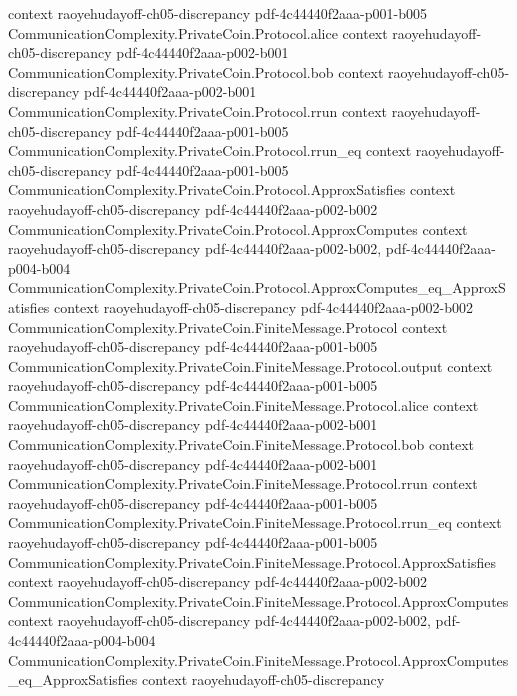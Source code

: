 \begin{lemma}
  {context}
  {raoyehudayoff-ch05-discrepancy}
  {pdf-4c44440f2aaa-p001-b005}
\proofstep
  {CommunicationComplexity.PrivateCoin.Protocol.alice}
  {context}
  {raoyehudayoff-ch05-discrepancy}
  {pdf-4c44440f2aaa-p002-b001}
\proofstep
  {CommunicationComplexity.PrivateCoin.Protocol.bob}
  {context}
  {raoyehudayoff-ch05-discrepancy}
  {pdf-4c44440f2aaa-p002-b001}
\proofstep
  {CommunicationComplexity.PrivateCoin.Protocol.rrun}
  {context}
  {raoyehudayoff-ch05-discrepancy}
  {pdf-4c44440f2aaa-p001-b005}
\proofstep
  {CommunicationComplexity.PrivateCoin.Protocol.rrun_eq}
  {context}
  {raoyehudayoff-ch05-discrepancy}
  {pdf-4c44440f2aaa-p001-b005}
\proofstep
  {CommunicationComplexity.PrivateCoin.Protocol.ApproxSatisfies}
  {context}
  {raoyehudayoff-ch05-discrepancy}
  {pdf-4c44440f2aaa-p002-b002}
\proofstep
  {CommunicationComplexity.PrivateCoin.Protocol.ApproxComputes}
  {context}
  {raoyehudayoff-ch05-discrepancy}
  {pdf-4c44440f2aaa-p002-b002,
    pdf-4c44440f2aaa-p004-b004}
\proofstep
  {CommunicationComplexity.PrivateCoin.Protocol.ApproxComputes_eq_ApproxSatisfies}
  {context}
  {raoyehudayoff-ch05-discrepancy}
  {pdf-4c44440f2aaa-p002-b002}
\proofstep
  {CommunicationComplexity.PrivateCoin.FiniteMessage.Protocol}
  {context}
  {raoyehudayoff-ch05-discrepancy}
  {pdf-4c44440f2aaa-p001-b005}
\proofstep
  {CommunicationComplexity.PrivateCoin.FiniteMessage.Protocol.output}
  {context}
  {raoyehudayoff-ch05-discrepancy}
  {pdf-4c44440f2aaa-p001-b005}
\proofstep
  {CommunicationComplexity.PrivateCoin.FiniteMessage.Protocol.alice}
  {context}
  {raoyehudayoff-ch05-discrepancy}
  {pdf-4c44440f2aaa-p002-b001}
\proofstep
  {CommunicationComplexity.PrivateCoin.FiniteMessage.Protocol.bob}
  {context}
  {raoyehudayoff-ch05-discrepancy}
  {pdf-4c44440f2aaa-p002-b001}
\proofstep
  {CommunicationComplexity.PrivateCoin.FiniteMessage.Protocol.rrun}
  {context}
  {raoyehudayoff-ch05-discrepancy}
  {pdf-4c44440f2aaa-p001-b005}
\proofstep
  {CommunicationComplexity.PrivateCoin.FiniteMessage.Protocol.rrun_eq}
  {context}
  {raoyehudayoff-ch05-discrepancy}
  {pdf-4c44440f2aaa-p001-b005}
\proofstep
  {CommunicationComplexity.PrivateCoin.FiniteMessage.Protocol.ApproxSatisfies}
  {context}
  {raoyehudayoff-ch05-discrepancy}
  {pdf-4c44440f2aaa-p002-b002}
\proofstep
  {CommunicationComplexity.PrivateCoin.FiniteMessage.Protocol.ApproxComputes}
  {context}
  {raoyehudayoff-ch05-discrepancy}
  {pdf-4c44440f2aaa-p002-b002,
    pdf-4c44440f2aaa-p004-b004}
\proofstep
  {CommunicationComplexity.PrivateCoin.FiniteMessage.Protocol.ApproxComputes_eq_ApproxSatisfies}
  {context}
  {raoyehudayoff-ch05-discrepancy}

\end{lemma}
